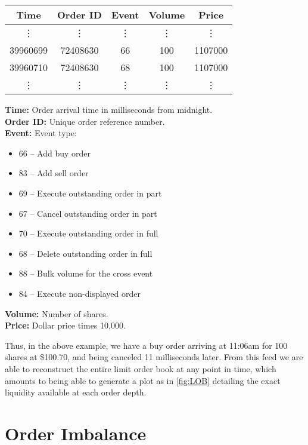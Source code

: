 \begin{table}[H]
\centering
{}
\begin{tabular}{@{} *{5}{c} @{}}
\toprule
Time & Order ID & Event & Volume & Price \\
\midrule
\vdots & \vdots & \vdots & \vdots & \vdots \\
39960699 &72408630 & 66 & 100 & 1107000 \\
39960710 & 72408630 & 68 & 100 & 1107000 \\
\vdots & \vdots & \vdots & \vdots & \vdots \\
\bottomrule
\end{tabular}
\label{tbl:ITCHevents}
\end{table}
{\bf Time:} Order arrival time in milliseconds from midnight. \\
{\bf Order ID:} Unique order reference number. \\
{\bf Event:} Event type:
\vspace{-\topsep}
\begin{itemize}[label={},nolistsep]
\item 66 -- Add buy order
\item 83 -- Add sell order
\item 69 -- Execute outstanding order in part
\item 67 -- Cancel outstanding order in part
\item 70 -- Execute outstanding order in full
\item 68 -- Delete outstanding order in full
\item 88 -- Bulk volume for the cross event
\item 84 -- Execute non-displayed order
\end{itemize}
\vspace{-\topsep}
{\bf Volume:} Number of shares. \\
{\bf Price:} Dollar price times 10,000. \par  
Thus, in the above example, we have a buy order arriving at 11:06am for 100 shares at \$100.70, and being canceled 11 milliseconds later. From this feed we are able to reconstruct the entire limit order book at any point in time, which amounts to being able to generate a plot as in \autoref{fig:LOB} detailing the exact liquidity available at each order depth.

\section{Order Imbalance}

